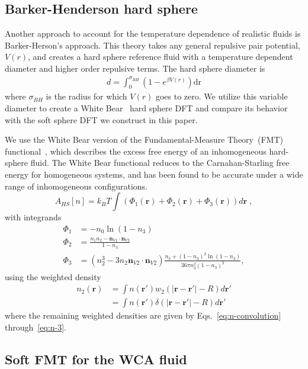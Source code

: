 \documentclass[letterpaper,twocolumn,amsmath,amssymb,prb]{revtex4-1}
\newcommand{\rr}{\textbf{r}}
\begin{document}
\subsection{Barker-Henderson hard sphere}

Another approach to account for the temperature dependence of
realistic fluids is Barker-Herson's
approach\cite{barker1967perturbation}. This theory takes any general
repulsive pair potential, $V(r)$, and creates a hard sphere reference fluid
with a temperature dependent diameter and higher order repulsive
terms. The hard sphere diameter is
\begin{align}
  d = \int_0^{\sigma_{BH}}\left( 1 - e^{\beta V(r)} \right)\mathrm{dr}
  \label{eq:bh-diameter}
\end{align}
where $\sigma_{BH}$ is the radius for which $V(r)$ goes to zero.  We
utilize this variable diameter to create a White
Bear~\cite{roth2002whitebear} hard sphere DFT and compare its behavior
with the soft sphere DFT we construct in this paper.

We use the White Bear version of the Fundamental-Measure Theory~(FMT)
functional~\cite{roth2002whitebear}, which describes the excess free
energy of an inhomogeneous hard-sphere fluid.  The White Bear
functional reduces to the Carnahan-Starling free energy for
homogeneous systems, and has been found to be accurate under a wide
range of inhomogeneous configurations.
\begin{equation}
A_\textit{HS}[n] = k_B T \int \left(\Phi_1(\rr) + \Phi_2(\rr) + \Phi_3(\rr)\right) d\rr \; ,
\end{equation}
with integrands
\begin{align}
\Phi_1 &= -n_0 \ln\left( 1 - n_3\right)\\
\Phi_2 &= \frac{n_1 n_2 - \mathbf{n}_{V1} \cdot\mathbf{n}_{V2}}{1-n_3} \\
\Phi_3 &= (n_2^3 - 3 n_2 \mathbf{n}_{V2} \cdot \mathbf{n}_{V2}) \frac{
  n_3 + (1-n_3)^2 \ln(1-n_3)
}{
  36\pi n_3^2\left( 1 - n_3 \right)^2
} ,
\end{align}
using the weighted density
\begin{align}
  n_2(\rr) &= \int n(\rr') w_2(\left|\rr - \rr'\right| - R) d\rr' \\
           &= \int n(\rr') \delta(\left|\rr - \rr'\right| - R) d\rr'
  \label{eq:white-bear-n2}
\end{align}
where the remaining weighted densities are given by
Eqs.~\ref{eq:n-convolution} through~\ref{eq:n-3}.

\subsection{Soft FMT for the WCA fluid}
\end{document}
